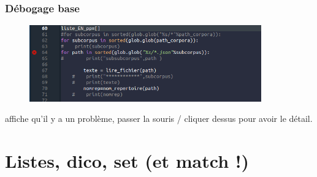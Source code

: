 \begin{frame}
  \frametitle{Débogage base}
  \begin{figure}
  \includegraphics[width=10cm]{images/spyder_signal_erreur.png}
	\end{figure} 
	 affiche qu'il y a un problème, passer la souris / cliquer dessus pour avoir le détail. 
  \end{frame}
  
\section{Listes, dico, set (et match !)}

